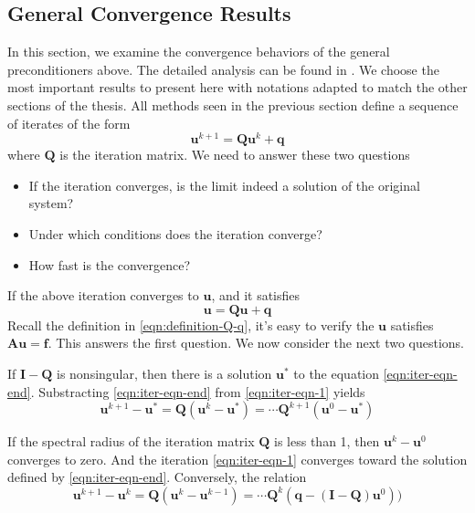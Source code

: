 \subsection{General Convergence Results}
\label{section:convergence-analysis}
In this section, we examine the convergence behaviors of the general preconditioners above. The detailed analysis can be found in \cite{doi:10.1137/1.9780898718003}. We choose the most important results to present here with notations adapted to match the other sections of the thesis.
All methods seen in the previous section define a sequence of iterates of the form
\begin{equation}
    \boldsymbol{u}^{k+1} = \boldsymbol{Q}\boldsymbol{u}^k + \boldsymbol{q}
    \label{eqn:iter-eqn-1}
\end{equation}
where $\boldsymbol{Q}$ is the iteration matrix. We need to answer these two questions
\begin{itemize}
    \item If the iteration converges, is the limit indeed a solution of the original system?
    \item Under which conditions does the iteration converge?
    \item How fast is the convergence?
\end{itemize}
If the above iteration converges to $\boldsymbol{u}$, and it satisfies
\begin{equation}
    \boldsymbol{u} = \boldsymbol{Q}\boldsymbol{u} + \boldsymbol{q}
    \label{eqn:iter-eqn-end}
\end{equation}
Recall the definition in \autoref{eqn:definition-Q-q}, it's easy to verify the $\boldsymbol{u}$ satisfies $\boldsymbol{A}\boldsymbol{u}= \boldsymbol{f}$. This answers the first question. We now consider the next two questions.

If $\boldsymbol{I} - \boldsymbol{Q}$ is nonsingular, then there is a solution $\boldsymbol{u}^*$ to the equation \autoref{eqn:iter-eqn-end}. Substracting \autoref{eqn:iter-eqn-end} from \autoref{eqn:iter-eqn-1} yields
\begin{equation}
    \boldsymbol{u}^{k+1} - \boldsymbol{u}^* = \boldsymbol{Q}(\boldsymbol{u}^k - \boldsymbol{u}^*) = \cdots \boldsymbol{Q}^{k+1}(\boldsymbol{u}^0 - \boldsymbol{u}^*)
\end{equation}



If the spectral radius of the iteration matrix $\boldsymbol{Q}$ is less than 1, then $\boldsymbol{u}^k - \boldsymbol{u}^0$ converges to zero. And the iteration \autoref{eqn:iter-eqn-1} converges toward the solution defined by \autoref{eqn:iter-eqn-end}. Conversely, the relation
\begin{equation}
    \boldsymbol{u}^{k+1} - \boldsymbol{u}^k = \boldsymbol{Q}(\boldsymbol{u}^{k} - \boldsymbol{u}^{k-1}) = \cdots \boldsymbol{Q}^{k} (\boldsymbol{q} - (\boldsymbol{I} - \boldsymbol{Q})\boldsymbol{u}^0))
\end{equation}

